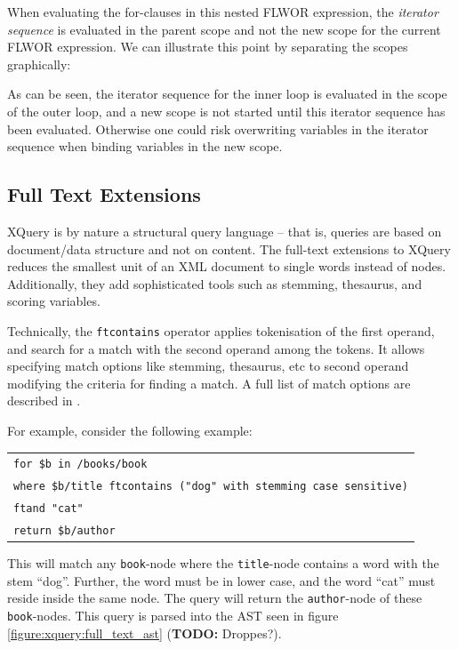 When evaluating the for-clauses in this nested FLWOR expression, the
\textit{iterator sequence} is evaluated in the parent scope and not the
new scope for the current FLWOR expression. We can illustrate this point by
separating the scopes graphically:
\begin{figure}
\centering
{}
\end{figure}

As can be seen, the iterator sequence for the inner loop is evaluated in the
scope of the outer loop, and a new scope is not started until this iterator
sequence has been evaluated. Otherwise one could risk overwriting variables in
the iterator sequence when binding variables in the new scope.


\subsection{Full Text Extensions}
\label{sect:theory:xquery:fulltext_ext}
XQuery is by nature a structural query language -- that is, queries are based on
document/data structure and not on content. The full-text extensions to XQuery
reduces the smallest unit of an XML document to single words instead of nodes.
Additionally, they add sophisticated tools such as stemming, thesaurus, and
scoring variables.

Technically, the \verb!ftcontains! operator applies tokenisation of the first operand, and search for a match with
the second operand among the tokens. It allows specifying match options like stemming, thesaurus, etc to second
operand modifying the criteria for finding a match. A full list of match options are described in \cite{w3c01}.

For example, consider the following example:
\begin{center}
\begin{tabular}{l}
\texttt{for \$b in /books/book} \\
\texttt{where \$b/title ftcontains ("dog" with stemming case sensitive)} \\ \quad\quad\quad
\texttt{ftand "cat"} \\
\texttt{return \$b/author}
\end{tabular}
\end{center}
This will match any \texttt{book}-node where the \texttt{title}-node contains a word with the stem ``dog''.
Further, the word must be in lower case, and the word ``cat'' must reside inside the same node. The query will
return the \texttt{author}-node of these \texttt{book}-nodes. This query is parsed into the AST seen in
figure \ref{figure:xquery:full_text_ast} (\textbf{\Large TODO:} Droppes?).

